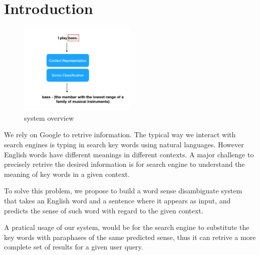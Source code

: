 \section{Introduction}

\begin{figure}[H]
  \centering
\includegraphics[width=0.5\textwidth]{graphs/overview.png}
\caption{system overview}
\end{figure}

We rely on Google to retrive information. The typical way we interact with
search engines is typing in search key words using natural languages. However
English words have different meanings in different contexts. A major challenge
to precisely retrive the desired information is for search engine to understand
the meaning of key words in a given context.

To solve this problem, we propose to build a word sense disambiguate system that
takes an English word and a sentence where it appears as input, and predicts the
sense of such word with regard to the given context. 

A pratical usage of our system, would be for the search engine to substitute the
key words with paraphases of the same predicted sense, thus it can retrive a
more complete set of results for a given user query.
